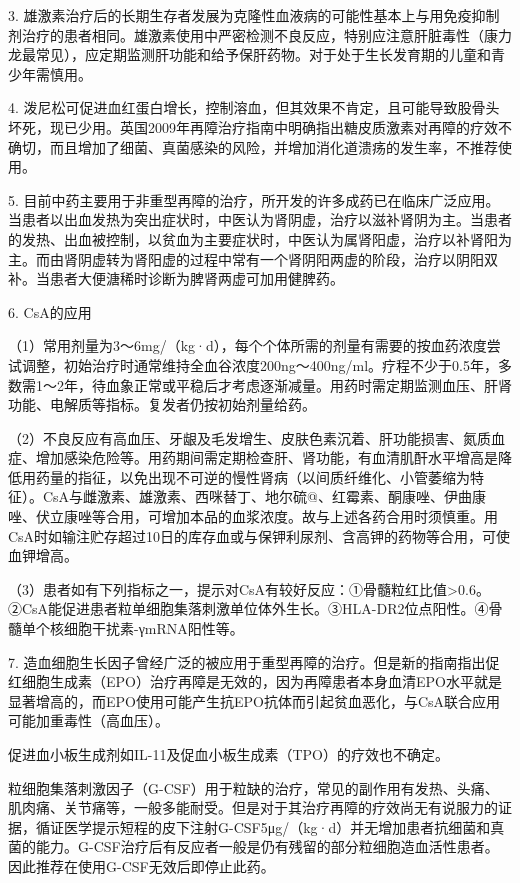 3.
雄激素治疗后的长期生存者发展为克隆性血液病的可能性基本上与用免疫抑制剂治疗的患者相同。雄激素使用中严密检测不良反应，特别应注意肝脏毒性（康力龙最常见），应定期监测肝功能和给予保肝药物。对于处于生长发育期的儿童和青少年需慎用。

4.
泼尼松可促进血红蛋白增长，控制溶血，但其效果不肯定，且可能导致股骨头坏死，现已少用。英国2009年再障治疗指南中明确指出糖皮质激素对再障的疗效不确切，而且增加了细菌、真菌感染的风险，并增加消化道溃疡的发生率，不推荐使用。

5.
目前中药主要用于非重型再障的治疗，所开发的许多成药已在临床广泛应用。当患者以出血发热为突出症状时，中医认为肾阴虚，治疗以滋补肾阴为主。当患者的发热、出血被控制，以贫血为主要症状时，中医认为属肾阳虚，治疗以补肾阳为主。而由肾阴虚转为肾阳虚的过程中常有一个肾阴阳两虚的阶段，治疗以阴阳双补。当患者大便溏稀时诊断为脾肾两虚可加用健脾药。

6. CsA的应用

（1）常用剂量为3～6mg/（kg·d），每个个体所需的剂量有需要的按血药浓度尝试调整，初始治疗时通常维持全血谷浓度200ng～400ng/ml。疗程不少于0.5年，多数需1～2年，待血象正常或平稳后才考虑逐渐减量。用药时需定期监测血压、肝肾功能、电解质等指标。复发者仍按初始剂量给药。

（2）不良反应有高血压、牙龈及毛发增生、皮肤色素沉着、肝功能损害、氮质血症、增加感染危险等。用药期间需定期检查肝、肾功能，有血清肌酐水平增高是降低用药量的指征，以免出现不可逆的慢性肾病（以间质纤维化、小管萎缩为特征）。CsA与雌激素、雄激素、西咪替丁、地尔硫@、红霉素、酮康唑、伊曲康唑、伏立康唑等合用，可增加本品的血浆浓度。故与上述各药合用时须慎重。用CsA时如输注贮存超过10日的库存血或与保钾利尿剂、含高钾的药物等合用，可使血钾增高。

（3）患者如有下列指标之一，提示对CsA有较好反应：①骨髓粒红比值\textgreater{}0.6。②CsA能促进患者粒单细胞集落刺激单位体外生长。③HLA-DR2位点阳性。④骨髓单个核细胞干扰素-γmRNA阳性等。

7.
造血细胞生长因子曾经广泛的被应用于重型再障的治疗。但是新的指南指出促红细胞生成素（EPO）治疗再障是无效的，因为再障患者本身血清EPO水平就是显著增高的，而EPO使用可能产生抗EPO抗体而引起贫血恶化，与CsA联合应用可能加重毒性（高血压）。

促进血小板生成剂如IL-11及促血小板生成素（TPO）的疗效也不确定。

粒细胞集落刺激因子（G-CSF）用于粒缺的治疗，常见的副作用有发热、头痛、肌肉痛、关节痛等，一般多能耐受。但是对于其治疗再障的疗效尚无有说服力的证据，循证医学提示短程的皮下注射G-CSF5μg/（kg·d）并无增加患者抗细菌和真菌的能力。G-CSF治疗后有反应者一般是仍有残留的部分粒细胞造血活性患者。因此推荐在使用G-CSF无效后即停止此药。

